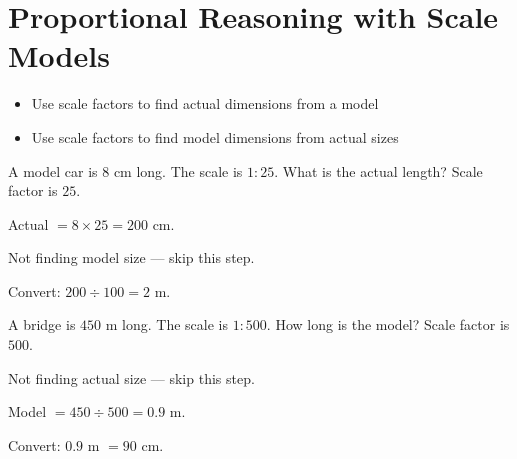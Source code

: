 \section{Proportional Reasoning with Scale Models}

\begin{stepGoal}
\begin{itemize}
    \item Use scale factors to find actual dimensions from a model
    \item Use scale factors to find model dimensions from actual sizes
\end{itemize}
\end{stepGoal}

\begin{stepVocabBox}
\end{stepVocabBox}

\begin{stepsCard}
\end{stepsCard}

\begin{stepExample}{A model car is $8$ cm long. The scale is $1 : 25$. What is the actual length?}
     Scale factor is $25$.

     Actual $= 8 \times 25 = 200$ cm.

     Not finding model size — skip this step.

     Convert: $200 \div 100 = 2$ m.
\end{stepExample}

\begin{stepExample}{A bridge is $450$ m long. The scale is $1 : 500$. How long is the model?}
     Scale factor is $500$.

     Not finding actual size — skip this step.

     Model $= 450 \div 500 = 0.9$ m.

     Convert: $0.9$ m $= 90$ cm.
\end{stepExample}

